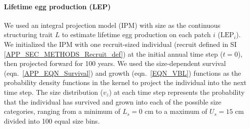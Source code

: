 \documentclass[12pt, oneside]{article}   	%
\begin{document}



\paragraph*{Lifetime egg production (LEP)}

We used an integral projection model (IPM) \citep{ellner2016data} with size as the continuous structuring trait $L$ to estimate lifetime egg production on each patch $i$ ($\text{LEP}_i$). We initialized the IPM with one recruit-sized individual (recruit defined in SI \ref{APP_SEC_METHODS_Recruit_def}) at the initial annual time step ($t=0$), then projected forward for 100 years. We used the size-dependent survival (eqn.\ \ref{APP_EQN_Survival}) and growth (eqn.\ \ref{EQN_VBL}) functions as the probability density functions in the kernel to project the individual into the next time step. The size distribution ($v_z$) at each time step represents the probability that the individual has survived and grown into each of the possible size categories, ranging from a minimum of $L_s=0$ cm to a maximum of $U_s=15$ cm divided into 100 equal size bins. %
\end{document}
